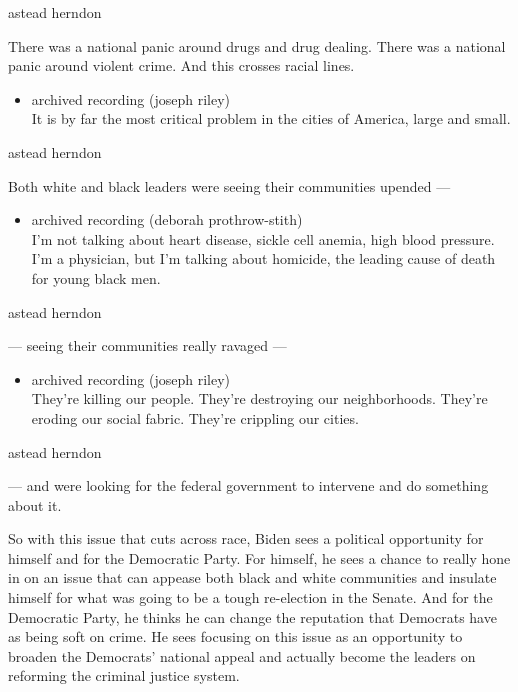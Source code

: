 astead herndon

There was a national panic around drugs and drug dealing. There was a
national panic around violent crime. And this crosses racial lines.

\begin{itemize}
\tightlist
\item
  archived recording (joseph riley)\\
  It is by far the most critical problem in the cities of America, large
  and small.
\end{itemize}

astead herndon

Both white and black leaders were seeing their communities upended ---

\begin{itemize}
\tightlist
\item
  archived recording (deborah prothrow-stith)\\
  I'm not talking about heart disease, sickle cell anemia, high blood
  pressure. I'm a physician, but I'm talking about homicide, the leading
  cause of death for young black men.
\end{itemize}

astead herndon

--- seeing their communities really ravaged ---

\begin{itemize}
\tightlist
\item
  archived recording (joseph riley)\\
  They're killing our people. They're destroying our neighborhoods.
  They're eroding our social fabric. They're crippling our cities.
\end{itemize}

astead herndon

--- and were looking for the federal government to intervene and do
something about it.

So with this issue that cuts across race, Biden sees a political
opportunity for himself and for the Democratic Party. For himself, he
sees a chance to really hone in on an issue that can appease both black
and white communities and insulate himself for what was going to be a
tough re-election in the Senate. And for the Democratic Party, he thinks
he can change the reputation that Democrats have as being soft on crime.
He sees focusing on this issue as an opportunity to broaden the
Democrats' national appeal and actually become the leaders on reforming
the criminal justice system.


